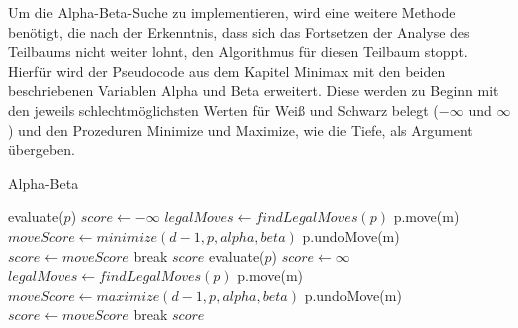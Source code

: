 Um die Alpha-Beta-Suche zu implementieren, wird eine weitere Methode benötigt, die nach der Erkenntnis, dass sich das Fortsetzen der Analyse des Teilbaums nicht weiter lohnt, den Algorithmus für diesen Teilbaum stoppt.
Hierfür wird der Pseudocode aus dem Kapitel Minimax mit den beiden beschriebenen Variablen Alpha und Beta erweitert.
Diese werden zu Beginn mit den jeweils schlechtmöglichsten Werten für Weiß und Schwarz belegt ($-\infty$ und $\infty$) und den Prozeduren Minimize und Maximize, wie die Tiefe, als Argument übergeben.

\begin{algorithm}
    \caption{Alpha-Beta}
    \begin{algorithmic}[1]
        \State \Return evaluate($p$)
        \Else
        \State $score \gets -\infty$
        \State $legalMoves \gets findLegalMoves(p)$
        \State p.move(m)
        \State $moveScore \gets minimize(d-1, p, alpha, beta)$
        \State p.undoMove(m)
        \State $score \gets moveScore$
        \EndIf
        \State break
        \EndIf
        \EndFor
        \EndIf
        \State \Return $score$
        \EndFunction
        \State \Return evaluate($p$)
        \Else
        \State $score \gets \infty$
        \State $legalMoves \gets findLegalMoves(p)$
        \State p.move(m)
        \State $moveScore \gets maximize(d-1, p, alpha, beta)$
        \State p.undoMove(m)
        \State $score \gets moveScore$
        \EndIf
        \State break
        \EndIf
        \EndFor
        \EndIf
        \State \Return $score$
        \EndFunction
    \end{algorithmic}
\end{algorithm}
\newpage

